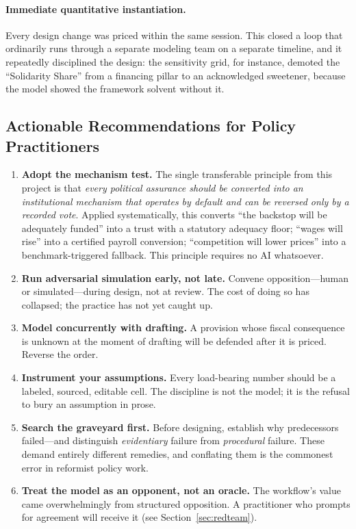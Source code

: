 \documentclass[11pt,a4paper]{article}
\begin{document}
\paragraph{Immediate quantitative instantiation.} Every design change was priced within the same session. This closed a loop that ordinarily runs through a separate modeling team on a separate timeline, and it repeatedly disciplined the design: the sensitivity grid, for instance, demoted the ``Solidarity Share'' from a financing pillar to an acknowledged sweetener, because the model showed the framework solvent without it.

\subsection{Actionable Recommendations for Policy Practitioners}

\begin{enumerate}[leftmargin=*,itemsep=4pt]
  \item \textbf{Adopt the mechanism test.} The single transferable principle from this project is that \emph{every political assurance should be converted into an institutional mechanism that operates by default and can be reversed only by a recorded vote}. Applied systematically, this converts ``the backstop will be adequately funded'' into a trust with a statutory adequacy floor; ``wages will rise'' into a certified payroll conversion; ``competition will lower prices'' into a benchmark-triggered fallback. This principle requires no AI whatsoever.
  \item \textbf{Run adversarial simulation early, not late.} Convene opposition---human or simulated---during design, not at review. The cost of doing so has collapsed; the practice has not yet caught up.
  \item \textbf{Model concurrently with drafting.} A provision whose fiscal consequence is unknown at the moment of drafting will be defended after it is priced. Reverse the order.
  \item \textbf{Instrument your assumptions.} Every load-bearing number should be a labeled, sourced, editable cell. The discipline is not the model; it is the refusal to bury an assumption in prose.
  \item \textbf{Search the graveyard first.} Before designing, establish why predecessors failed---and distinguish \emph{evidentiary} failure from \emph{procedural} failure. These demand entirely different remedies, and conflating them is the commonest error in reformist policy work.
  \item \textbf{Treat the model as an opponent, not an oracle.} The workflow's value came overwhelmingly from structured opposition. A practitioner who prompts for agreement will receive it (see Section~\ref{sec:redteam}).
\end{enumerate}
\end{document}
